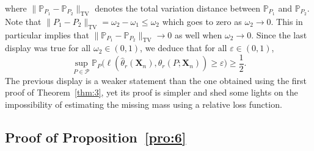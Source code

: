 \documentclass{article}
\newcommand{\1}{\boldsymbol{1}}
\newcommand{\PP}{\mathbb{P}}
\theoremstyle{plain}
\begin{document}
where $\|\PP_{P_1} - \PP_{P_2}\|_{\textrm{TV}}$ denotes the total variation distance between $\PP_{P_1}$ and $\PP_{P_2}$. Note that $\|P_1 - P_2\|_{\textrm{TV}} = \omega_2 - \omega_1 \leq \omega_2$ which goes to zero as $\omega_2 \to 0$. This in particular implies that $\|\PP_{P_1} - \PP_{P_2}\|_{\textrm{TV}}\to 0$ as well when $\omega_2 \to 0$. Since the last display was true for all $\omega_2 \in (0,1)$, we deduce that for all $\varepsilon\in (0,1)$,
\begin{equation*}
  \sup_{P\in \mathcal{P}}\PP_P\Big(%
  \ell(\hat{\theta}_r(\mathbf{X}_n),\theta_r(P;\mathbf{X}_n)) \geq \varepsilon
  \Big) \geq \frac{1}{2}.
\end{equation*}
The previous display is a weaker statement than the one obtained using the first proof of Theorem~\ref{thm:3}, yet its proof is simpler and shed some lights on the impossibility of estimating the missing mass using a relative loss function.

\subsection{Proof of Proposition~\ref{pro:6}}
\label{sec:proof-pro:6}
\end{document}
